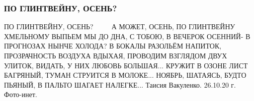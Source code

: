  
 
 

\subsubsection{ПО ГЛИНТВЕЙНУ, ОСЕНЬ?}
\label{sec:poetry.rus.taisia_vakulenko.osen_glintvein}

ПО ГЛИНТВЕЙНУ, ОСЕНЬ?  🍂🌿🍁🍂🌿🍁🍂
А МОЖЕТ, ОСЕНЬ, ПО ГЛИНТВЕЙНУ
ХМЕЛЬНОМУ ВЫПЬЕМ МЫ ДО ДНА,
С ТОБОЮ, В ВЕЧЕРОК ОСЕННИЙ-
В ПРОГНОЗАХ НЫНЧЕ ХОЛОДА?
В БОКАЛЫ РАЗОЛЬЁМ НАПИТОК,
ПРОЗРАЧНОСТЬ ВОЗДУХА ВДЫХАЯ,
ПРОВОДИМ ВЗГЛЯДОМ ДВУХ УЛИТОК,
ВИДАТЬ, У НИХ  ЛЮБОВЬ БОЛЬШАЯ...
КРУЖИТ В ОЗОНЕ ЛИСТ БАГРЯНЫЙ,
ТУМАН СТРУИТСЯ В МОЛОКЕ...
НОЯБРЬ, ШАТАЯСЬ, БУДТО ПЬЯНЫЙ,
В ПАЛЬТО ШАГАЕТ НАЛЕГКЕ...
Таисия Вакуленко. 
26.10.20 г.
Фото-инет.
